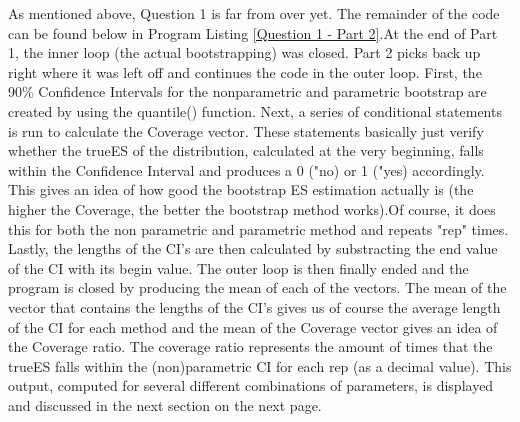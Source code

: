 \documentclass[12pt]{article}
\begin{document}
\newpage
As mentioned above, Question 1 is far from over yet. The remainder of the code can be found below in Program Listing \ref{Question 1 - Part 2}.\newline At the end of Part 1, the inner loop (the actual bootstrapping) was closed. Part 2 picks back up right where it was left off and continues the code in the outer loop. First, the 90\% Confidence Intervals for the nonparametric and parametric bootstrap are created by using the quantile() function. Next, a series of conditional statements is run to calculate the Coverage vector. These statements basically just verify whether the trueES of the distribution, calculated at the very beginning, falls within the Confidence Interval and produces a 0 ("no) or 1 ("yes) accordingly. This gives an idea of how good the bootstrap ES estimation actually is (the higher the Coverage, the better the bootstrap method works).Of course, it does this for both the non parametric and parametric method and repeats "rep" times. 
Lastly, the lengths of the CI's are then calculated by substracting the end value of the CI with its begin value.\newline \newline
The outer loop is then finally ended and the program is closed by producing the mean of each of the vectors. The mean of the vector that contains the lengths of the CI's gives us of course the average length of the CI for each method and the mean of the Coverage vector gives an idea of the Coverage ratio. The coverage ratio represents the amount of times that the trueES falls within the (non)parametric CI for each rep (as a decimal value).
This output, computed for several different combinations of parameters, is displayed and discussed in the next section on the next page.  
\end{document}
